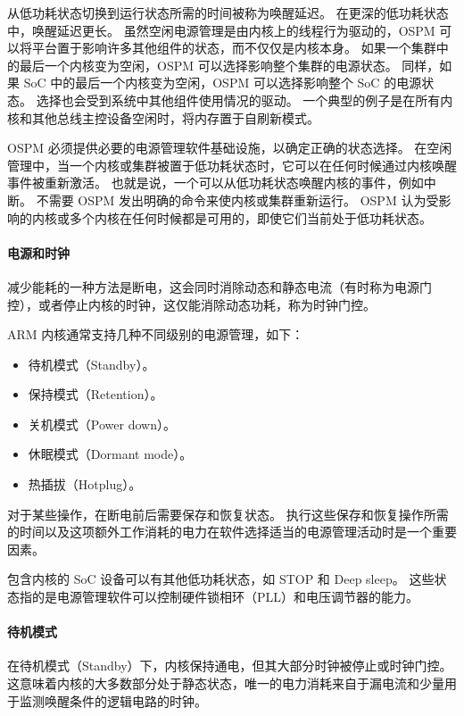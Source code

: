 从低功耗状态切换到运行状态所需的时间被称为唤醒延迟。
在更深的低功耗状态中，唤醒延迟更长。
虽然空闲电源管理是由内核上的线程行为驱动的，OSPM 可以将平台置于影响许多其他组件的状态，而不仅仅是内核本身。
如果一个集群中的最后一个内核变为空闲，OSPM 可以选择影响整个集群的电源状态。
同样，如果 SoC 中的最后一个内核变为空闲，OSPM 可以选择影响整个 SoC 的电源状态。
选择也会受到系统中其他组件使用情况的驱动。
一个典型的例子是在所有内核和其他总线主控设备空闲时，将内存置于自刷新模式。

OSPM 必须提供必要的电源管理软件基础设施，以确定正确的状态选择。
在空闲管理中，当一个内核或集群被置于低功耗状态时，它可以在任何时候通过内核唤醒事件被重新激活。
也就是说，一个可以从低功耗状态唤醒内核的事件，例如中断。
不需要 OSPM 发出明确的命令来使内核或集群重新运行。
OSPM 认为受影响的内核或多个内核在任何时候都是可用的，即使它们当前处于低功耗状态。

\paragraph*{电源和时钟}

减少能耗的一种方法是断电，这会同时消除动态和静态电流（有时称为电源门控），或者停止内核的时钟，这仅能消除动态功耗，称为时钟门控。

ARM 内核通常支持几种不同级别的电源管理，如下：

\begin{itemize}
\item
  待机模式（Standby）。
\item
  保持模式（Retention）。
\item
  关机模式（Power down）。
\item
  休眠模式（Dormant mode）。
\item
  热插拔（Hotplug）。
\end{itemize}

对于某些操作，在断电前后需要保存和恢复状态。
执行这些保存和恢复操作所需的时间以及这项额外工作消耗的电力在软件选择适当的电源管理活动时是一个重要因素。

包含内核的 SoC 设备可以有其他低功耗状态，如 STOP 和 Deep sleep。
这些状态指的是电源管理软件可以控制硬件锁相环（PLL）和电压调节器的能力。

\paragraph*{待机模式}

在待机模式（Standby）下，内核保持通电，但其大部分时钟被停止或时钟门控。
这意味着内核的大多数部分处于静态状态，唯一的电力消耗来自于漏电流和少量用于监测唤醒条件的逻辑电路的时钟。

